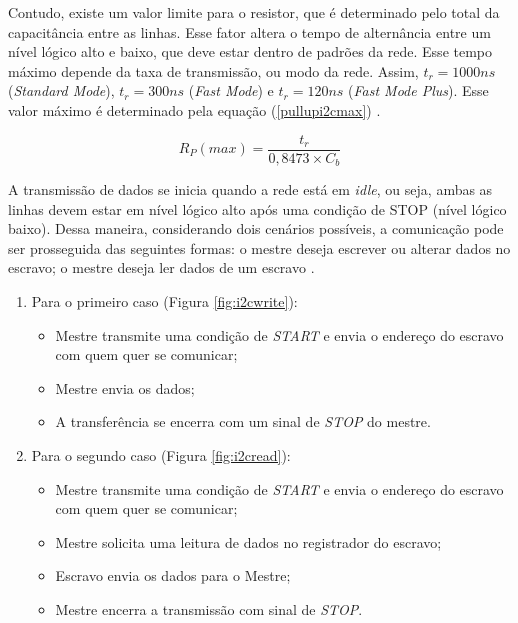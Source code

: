 Contudo, existe um valor limite para o resistor, que é determinado pelo total da capacitância entre as linhas. Esse fator altera o tempo de alternância entre um nível lógico alto e baixo, que deve estar dentro de padrões da rede. Esse tempo máximo depende da taxa de transmissão, ou modo da rede. Assim, $ t_r=1000ns  $ (\textit{Standard Mode}), $ t_r=300ns $ (\textit{Fast Mode}) e $ t_r=120ns  $ (\textit{Fast Mode Plus}). Esse valor máximo é determinado pela equação (\ref{pullupi2cmax}) \cite{man:texasI2Cpullup}.

\begin{equation}
	R_P(max) = \dfrac{ t_r }{0,8473 \times C_b}
	\label{pullupi2cmax}
\end{equation}

A transmissão de dados se inicia quando a rede está em \textit{idle}, ou seja, ambas as linhas devem estar em nível lógico alto após uma condição de STOP (nível lógico baixo). Dessa maneira, considerando dois cenários possíveis, a comunicação pode ser prosseguida das seguintes formas: o mestre deseja escrever ou alterar dados no escravo; o mestre deseja ler dados de um escravo \cite{man:texasI2C}.

\begin{enumerate}
\item Para o primeiro caso (Figura \ref{fig:i2cwrite}):
\begin{itemize}
	\item Mestre transmite uma condição de \textit{START} e envia o endereço do escravo com quem quer se comunicar;
	\item Mestre envia os dados;
	\item A transferência se encerra com um sinal de \textit{STOP} do mestre.
\end{itemize}

\item Para o segundo caso  (Figura \ref{fig:i2cread}):
\begin{itemize}
	\item Mestre transmite uma condição de \textit{START} e envia o endereço do escravo com quem quer se comunicar;
	\item Mestre solicita uma leitura de dados no registrador do escravo;
	\item Escravo envia os dados para o Mestre;
	\item Mestre encerra a transmissão com sinal de \textit{STOP}.
\end{itemize}
\end{enumerate}

